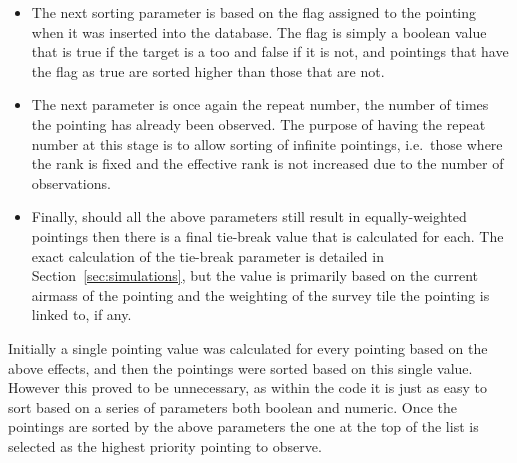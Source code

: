 \begin{colsection}
\begin{colsection}
\begin{itemize}
\item The next sorting parameter is based on the  flag assigned to the pointing when it was inserted into the database. The flag is simply a boolean value that is true if the target is a \gls{too} and false if it is not, and pointings that have the flag as true are sorted higher than those that are not.

\item The next parameter is once again the repeat number, the number of times the pointing has already been observed. The purpose of having the repeat number at this stage is to allow sorting of infinite pointings, i.e.\ those where the rank is fixed and the effective rank is not increased due to the number of observations.

\item Finally, should all the above parameters still result in equally-weighted pointings then there is a final tie-break value that is calculated for each. The exact calculation of the tie-break parameter is detailed in Section~\ref{sec:simulations}, but the value is primarily based on the current airmass of the pointing and the weighting of the survey tile the pointing is linked to, if any.

\end{itemize}

Initially a single pointing value was calculated for every pointing based on the above effects, and then the pointings were sorted based on this single value. However this proved to be unnecessary, as within the  code it is just as easy to sort based on a series of parameters both boolean and numeric. Once the pointings are sorted by the above parameters the one at the top of the list is selected as the highest priority pointing to observe.


\end{colsection}
\end{colsection}
